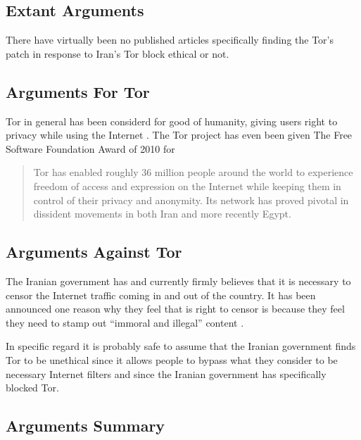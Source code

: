 \documentclass[11pt]{article}
\begin{document}
\begin{multicols}{2}
\section{Extant Arguments} 

There have virtually been no published articles specifically finding the Tor's
patch in response to Iran's Tor block ethical or not.

\subsection{Arguments For Tor}

Tor in general has been considerd for good of humanity, giving users right to
privacy while using the Internet \cite{TorCreatesSaferInternet, TorLastHope}.
The Tor project has even been given The Free Software Foundation Award of 2010
for \begin{quotation}Tor has enabled roughly 36 million people around the world
  to experience freedom of access and expression on the Internet while keeping
  them in control of their privacy and anonymity. Its network has proved pivotal
in dissident movements in both Iran and more recently
Egypt.\cite{FreeSoftwareAwards}\end{quotation}



\subsection{Arguments Against Tor}

The Iranian government has and currently firmly believes that it is necessary to
censor the Internet traffic coming in and out of the country. It has been
announced one reason why they feel that is right to censor is because they feel
they need to stamp out ``immoral and illegal'' content
\cite{CensorshipFearsRise}.

In specific regard it is probably safe to assume that the Iranian government
finds Tor to be unethical since it allows people to bypass what they consider to
be necessary Internet filters and since the Iranian government has specifically
blocked Tor\cite{IranBlocksTorSameDayFix}.


\subsection{Arguments Summary}


\end{multicols}
\end{document}
